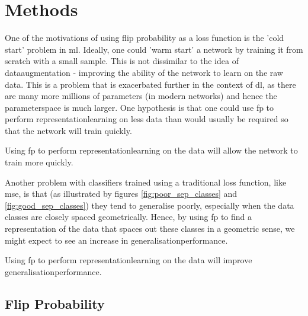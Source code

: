 \chapter{Methods}

One of the motivations of using flip probability as a loss function is the 'cold start' problem in \gls{ml}. Ideally, one could 'warm start' a network by training it from scratch with a small sample. This is not dissimilar to the idea of \gls{dataaugmentation} - improving the ability of the network to learn on the raw data. This is a problem that is exacerbated further in the context of \gls{dl}, as there are many more millions of parameters (in modern networks) and hence the \gls{parameterspace} is much larger. One hypothesis is that one could use \gls{fp} to perform \gls{representationlearning} on less data than would usually be required so that the network will train quickly.

\begin{hypothesis} %
Using \gls{fp} to perform \gls{representationlearning} on the data will allow the network to train more quickly.
\label{hyp:first}
\end{hypothesis}

Another problem with classifiers trained using a traditional loss function, like \gls{mse}, is that (as illustrated by figures \ref{fig:poor_sep_classes} and \ref{fig:good_sep_classes}) they tend to generalise poorly, especially when the data classes are closely spaced geometrically. Hence, by using \gls{fp} to find a representation of the data that spaces out these classes in a geometric sense, we might expect to see an increase in \gls{generalisationperformance}.

\begin{hypothesis} %
Using \gls{fp} to perform \gls{representationlearning} on the data will improve \gls{generalisationperformance}.
\label{hyp:second}
\end{hypothesis}


\section{Flip Probability}

